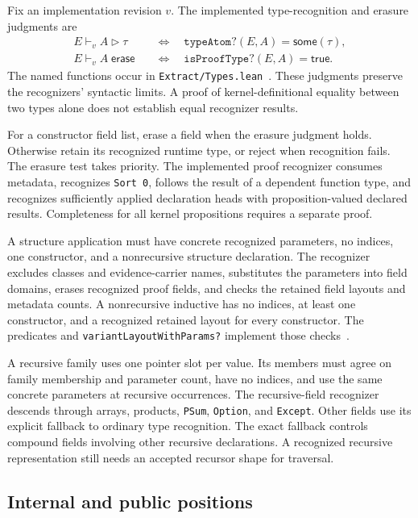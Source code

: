 \documentclass[11pt]{article}
\newcommand{\code}[1]{\texttt{#1}}
\newcommand{\longcode}[1]{\texttt{\seqsplit{#1}}}
\newcommand{\some}{\mathsf{some}}
\newcommand{\rep}{\mathrel{\triangleright}}
\begin{document}
Fix an implementation revision $v$.  The implemented type-recognition and erasure judgments are
\begin{align*}
E\vdash_v A\rep\tau
&\quad\Longleftrightarrow\quad
\code{typeAtom?}(E,A)=\some(\tau),\\
E\vdash_v A\;\mathsf{erase}
&\quad\Longleftrightarrow\quad
\code{isProofType?}(E,A)=\mathsf{true}.
\end{align*}
The named functions occur in \code{Extract/Types.lean}~\cite{types}.  These judgments preserve the recognizers' syntactic limits.  A proof of kernel-definitional equality between two types alone does not establish equal recognizer results.

For a constructor field list, erase a field when the erasure judgment holds.  Otherwise retain its recognized runtime type, or reject when recognition fails.  The erasure test takes priority.  The implemented proof recognizer consumes metadata, recognizes \code{Sort 0}, follows the result of a dependent function type, and recognizes sufficiently applied declaration heads with proposition-valued declared results.  Completeness for all kernel propositions requires a separate proof.

A structure application must have concrete recognized parameters, no indices, one constructor, and a nonrecursive structure declaration.  The recognizer excludes classes and evidence-carrier names, substitutes the parameters into field domains, erases recognized proof fields, and checks the retained field layouts and metadata counts.  A nonrecursive inductive has no indices, at least one constructor, and a recognized retained layout for every constructor.  The predicates \longcode{structureFieldKindsWithParams?} and \code{variantLayoutWithParams?} implement those checks~\cite{types}.

A recursive family uses one pointer slot per value.  Its members must agree on family membership and parameter count, have no indices, and use the same concrete parameters at recursive occurrences.  The recursive-field recognizer descends through arrays, products, \code{PSum}, \code{Option}, and \code{Except}.  Other fields use its explicit fallback to ordinary type recognition.  The exact fallback controls compound fields involving other recursive declarations.  A recognized recursive representation still needs an accepted recursor shape for traversal.

\subsection{Internal and public positions}
\end{document}
